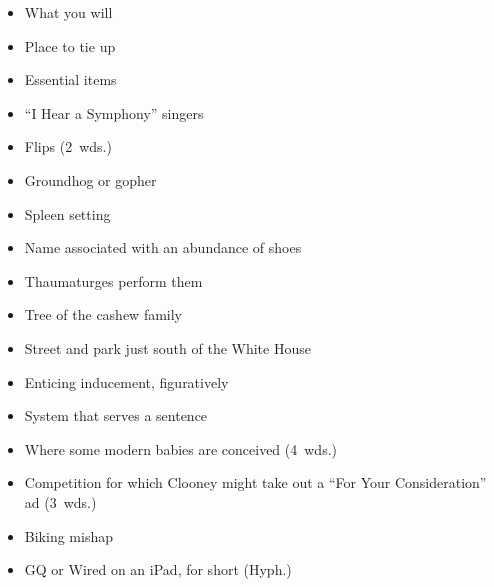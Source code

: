 {    \begin{itemize}
      \item
        What you will
      \item
        Place to tie up
    \end{itemize}
  \item
    \begin{itemize}
      \item
        Essential items
      \item
        ``I Hear a Symphony'' singers
    \end{itemize}
  \item
    \begin{itemize}
      \item
        Flips (2~wds.)
      \item
        Groundhog or gopher
    \end{itemize}
  \item
    \begin{itemize}
      \item
        Spleen setting
      \item
        Name associated with an abundance of shoes
    \end{itemize}
  \item
    \begin{itemize}
      \item
        Thaumaturges perform them
      \item
        Tree of the cashew family
    \end{itemize}
  \item
    \begin{itemize}
      \item
        Street and park just south of the White House
      \item
        Enticing inducement, figuratively
    \end{itemize}
}{%
  \item
    \begin{itemize}
      \item
        System that serves a sentence
      \item
        Where some modern babies are conceived (4~wds.)
      \item
        Competition for which Clooney might take out a ``For Your Consideration'' ad (3~wds.)
      \item
        Biking mishap
      \item
        GQ or Wired on an iPad, for short (Hyph.)

\end{itemize}}
